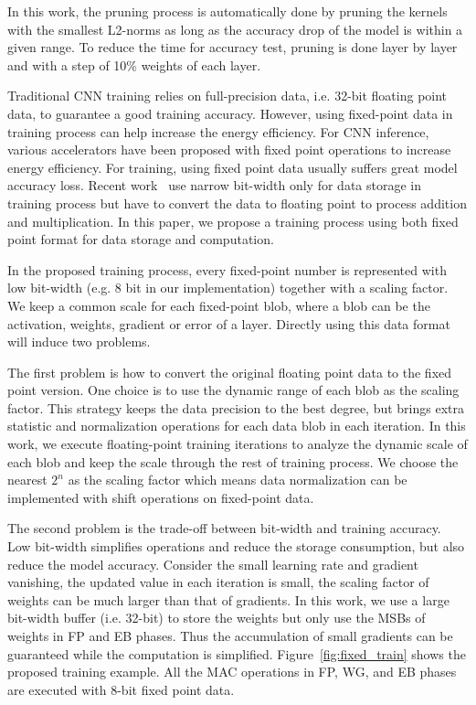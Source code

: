 In this work, the pruning process is automatically done by pruning the kernels with the smallest L2-norms as long as the accuracy drop of the model is within a given range. To reduce the time for accuracy test, pruning is done layer by layer and with a step of 10\% weights of each layer.

Traditional CNN training relies on full-precision data, i.e. 32-bit floating point data, to guarantee a good training accuracy. However, using fixed-point data in training process can help increase the energy efficiency. For CNN inference, various accelerators have been proposed with fixed point operations to increase energy efficiency. For training, using fixed point data usually suffers great model accuracy loss. Recent work~\cite{zhou2016dorefa} use narrow bit-width only for data storage in training process but have to convert the data to floating point to process addition and multiplication. In this paper, we propose a training process using both fixed point format for data storage and computation. 

In the proposed training process, every fixed-point number is represented with low bit-width (e.g. 8 bit in our implementation) together with a scaling factor. We keep a common scale for each fixed-point blob, where a blob can be the activation, weights, gradient or error of a layer. Directly using this data format will induce two problems.

The first problem is how to convert the original floating point data to the fixed point version. One choice is to use the dynamic range of each blob as the scaling factor. This strategy keeps the data precision to the best degree, but brings extra statistic and normalization operations for each data blob in each iteration. In this work, we execute floating-point training iterations to analyze the dynamic scale of each blob and keep the scale through the rest of training process. We choose the nearest $2^n$ as the scaling factor which means data normalization can be implemented with shift operations on fixed-point data.

The second problem is the trade-off between bit-width and training accuracy. Low bit-width simplifies operations and reduce the storage consumption, but also reduce the model accuracy. Consider the small learning rate and gradient vanishing, the updated value in each iteration is small, the scaling factor of weights can be much larger than that of gradients. In this work, we use a large bit-width buffer (i.e. 32-bit) to store the weights but only use the MSBs of weights in FP and EB phases. Thus the accumulation of small gradients can be guaranteed while the computation is simplified. Figure~\ref{fig:fixed_train} shows the proposed training example. All the MAC operations in FP, WG, and EB phases are executed with 8-bit fixed point data.  




